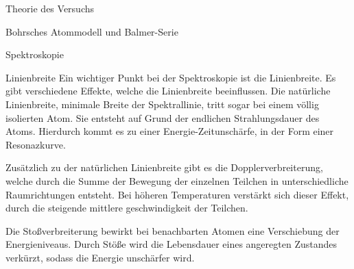 \documentclass[pdftex, a4paper,11pt, twoside, ngerman]{report}
\begin{document}
\begin{chapter}{Theorie des Versuchs}
\begin{section}{Bohrsches Atommodell und Balmer-Serie}
\begin{subsection}{Spektroskopie}
\begin{subsubsection}{Linienbreite}
Ein wichtiger Punkt bei der Spektroskopie ist die Linienbreite. Es gibt verschiedene Effekte, welche die Linienbreite beeinflussen. 
Die natürliche Linienbreite, minimale Breite der Spektrallinie, tritt sogar bei einem völlig isolierten Atom. Sie entsteht auf Grund der endlichen Strahlungsdauer des Atoms. Hierdurch kommt es zu einer Energie-Zeitunschärfe, in der Form einer Resonazkurve.

Zusätzlich zu der natürlichen Linienbreite gibt es die Dopplerverbreiterung, welche durch die Summe  der Bewegung der einzelnen Teilchen in unterschiedliche Raumrichtungen entsteht. 
Bei höheren Temperaturen verstärkt sich dieser Effekt, durch die steigende mittlere geschwindigkeit der Teilchen.

Die Stoßverbreiterung bewirkt bei benachbarten Atomen eine Verschiebung der Energieniveaus.
Durch Stöße wird die Lebensdauer eines angeregten Zustandes verkürzt, sodass die Energie unschärfer wird.


\end{subsubsection}

      \end{subsection}
      
      
    \end{section}
    
  \end{chapter}
  
  
  
\end{document}
